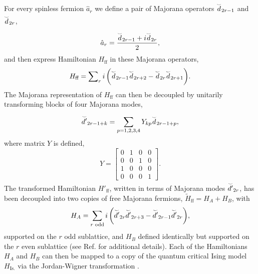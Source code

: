 \documentclass[aps,prl,twocolumn,showpacs,superscriptaddress,floatfix,10pt]{revtex4-1}
\newcommand{\frw}[1]{$\overset{\lower0.5em\hbox{$\smash{\scriptscriptstyle\smile}$}} #1$}
\begin{document}
For every spinless fermion ${\hat a}_r$ we define a pair of Majorana operators
\frw{d_{2r-1}} and \frw{d_{2r}}, 
\begin{equation}
{{\hat a}_r} = \frac{{{{\overset{\lower0.5em\hbox{$\smash{\scriptscriptstyle\smile}$}}{d} }_{2r - 1}} + i{{\overset{\lower0.5em\hbox{$\smash{\scriptscriptstyle\smile}$}}{d} }_{2r}}}}{2}, \label{eq:B2}
\end{equation}
and then express Hamiltonian ${H_\textrm{ff}}$ in these Majorana operators,
\begin{equation}
{H_\textrm{ff}} = \sum\nolimits_r {i\left( {{{\overset{\lower0.5em\hbox{$\smash{\scriptscriptstyle\smile}$}}{d} }_{2r - 1}}{{\overset{\lower0.5em\hbox{$\smash{\scriptscriptstyle\smile}$}}{d} }_{2r + 2}} - {{\overset{\lower0.5em\hbox{$\smash{\scriptscriptstyle\smile}$}}{d} }_{2r}}{{\overset{\lower0.5em\hbox{$\smash{\scriptscriptstyle\smile}$}}{d} }_{2r + 1}}} \right)}. \label{eq:B3}
\end{equation}
The Majorana representation of ${H_\textrm{ff}}$ can then be decoupled by
unitarily transforming blocks of four Majorana modes,
\begin{equation}
{{\overset{\lower0.5em\hbox{$\smash{\scriptscriptstyle\smile}$}}{d'}}_{2r - 1 + k}} = \sum\limits_{p = 1,2,3,4} {{Y_{kp}}{{\overset{\lower0.5em\hbox{$\smash{\scriptscriptstyle\smile}$}}{d} }_{2r - 1 + p}}}, \label{eq:B4}
\end{equation}
where matrix $Y$ is defined,
\begin{equation}
Y = \left[ {\begin{array}{*{20}{c}}
  0&1&0&0 \\ 
  0&0&1&0 \\ 
  1&0&0&0 \\ 
  0&0&0&1 
\end{array}} \right]. \label{eq:B5}
\end{equation}
The transformed Hamiltonian $H'_\textrm{ff}$, written in terms of Majorana
modes \frw{{d'}_{2r}}, has been decoupled into two copies of free Majorana
fermions, ${{\tilde H}_\textrm{ff}} = {H_A} + {H_B}$, with
\begin{equation}
{H_A} = \sum\limits_{r\textrm{ odd}} {i\left( {{{\overset{\lower0.5em\hbox{$\smash{\scriptscriptstyle\smile}$}}{d'} }_{2r}}{{\overset{\lower0.5em\hbox{$\smash{\scriptscriptstyle\smile}$}}{d'} }_{2r + 3}} - {{\overset{\lower0.5em\hbox{$\smash{\scriptscriptstyle\smile}$}}{d'} }_{2r - 1}}{{\overset{\lower0.5em\hbox{$\smash{\scriptscriptstyle\smile}$}}{d'} }_{2r}}} \right)}, \label{eq:B6}
\end{equation}
supported on the $r$ odd sublattice, and ${H_B}$ defined identically but
supported on the $r$ even sublattice (see Ref.\cite{Decouple} for additional
details). Each of the Hamiltonians $H_A$ and $H_B$ can then be mapped to a copy
of the quantum critical Ising model $H_\textrm{Is.}$ via the Jordan-Wigner
transformation \cite{GroundEnt}.
\end{document}
